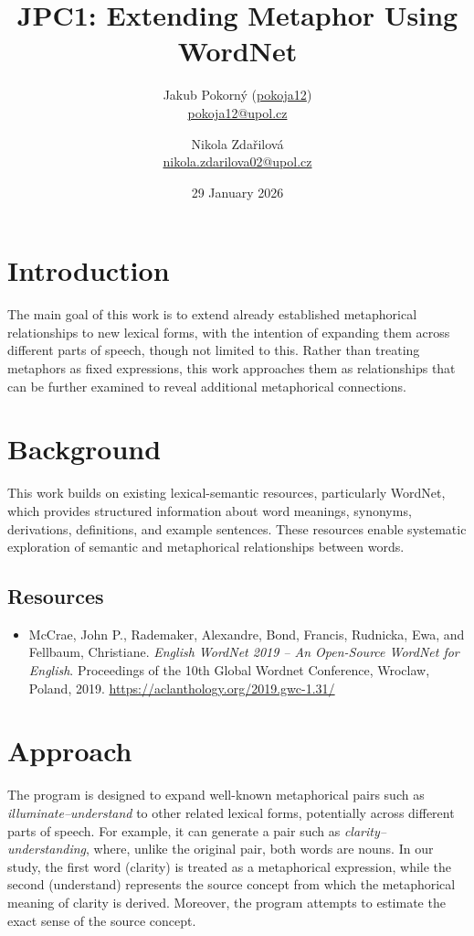\documentclass[12pt,a4paper]{article}
\title{JPC1: Extending Metaphor Using WordNet}
\author{
Jakub Pokorný (\href{https://github.com/pokoja12}{pokoja12})\\
\href{mailto:student1@email.com}{pokoja12@upol.cz}
\and
Nikola Zdařilová\\
\href{mailto:student2@email.com}{nikola.zdarilova02@upol.cz}
}
\date{29 January 2026}
\begin{document}
\maketitle


\section{Introduction}
\label{sec:introduction}

The main goal of this work is to extend already established metaphorical relationships to new lexical forms, with the intention of expanding them across different parts of speech, though not limited to this. Rather than treating metaphors as fixed expressions, this work approaches them as relationships that can be further examined to reveal additional metaphorical connections. 

\section{Background}
\label{sec:background}

This work builds on existing lexical-semantic resources, particularly WordNet, which provides structured information about word meanings, synonyms, derivations, definitions, and example sentences. These resources enable systematic exploration of semantic and metaphorical relationships between words.

\subsection*{Resources}
\label{sec:resources}

\begin{itemize}
\item McCrae, John P., Rademaker, Alexandre, Bond, Francis, Rudnicka, Ewa, and Fellbaum, Christiane.
\textit{English WordNet 2019 -- An Open-Source WordNet for English}.
Proceedings of the 10th Global Wordnet Conference, Wroclaw, Poland, 2019.
\url{https://aclanthology.org/2019.gwc-1.31/}
\end{itemize}

\clearpage  %

\section{Approach}
\label{sec:approach}

The program is designed to expand well-known metaphorical pairs such as \textit{illuminate--understand} to other related lexical forms, potentially across different parts of speech. For example, it can generate a pair such as \textit{clarity--understanding}, where, unlike the original pair, both words are nouns. In our study, the first word (clarity) is treated as a metaphorical expression, while the second (understand) represents the source concept from which the metaphorical meaning of clarity is derived. Moreover, the program attempts to estimate the exact sense of the source concept.
\end{document}
